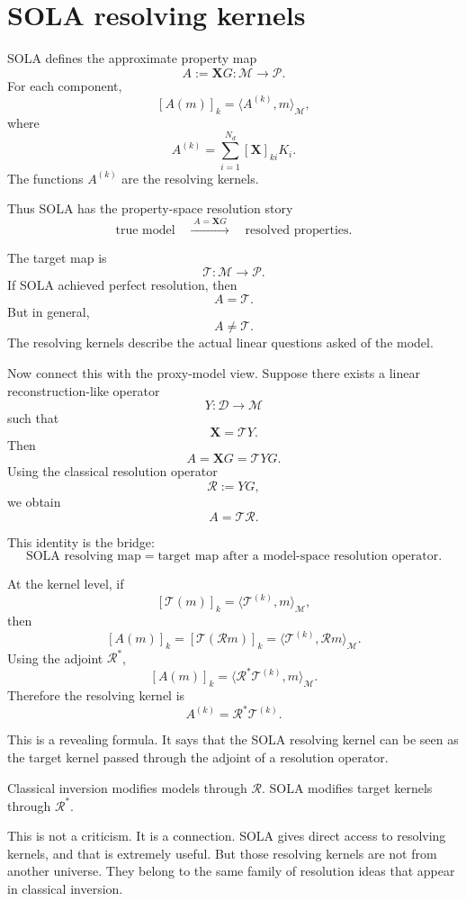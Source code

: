 \documentclass[11pt,openany]{book}
\theoremstyle{definition}
\theoremstyle{remark}
\newcommand{\M}{\mathcal M}
\newcommand{\D}{\mathcal D}
\newcommand{\Pspace}{\mathcal P}
\newcommand{\Tau}{\mathcal{T}}
\begin{document}
\section{SOLA resolving kernels}

SOLA defines the approximate property map
\[
  A:=\mathbf XG:\M\to\Pspace.
\]
For each component,
\[
  [A(m)]_k
  =
  \langle A^{(k)},m\rangle_{\M},
\]
where
\[
  A^{(k)}
  =
  \sum_{i=1}^{N_d}[\mathbf X]_{ki}K_i.
\]
The functions \(A^{(k)}\) are the resolving kernels.

Thus SOLA has the property-space resolution story
\[
  \text{true model}
  \quad
  \xrightarrow{\;A=\mathbf XG\;}
  \quad
  \text{resolved properties}.
\]

The target map is
\[
  \Tau:\M\to\Pspace.
\]
If SOLA achieved perfect resolution, then
\[
  A=\Tau.
\]
But in general,
\[
  A\neq\Tau.
\]
The resolving kernels describe the actual linear questions asked of the model.

Now connect this with the proxy-model view. Suppose there exists a linear reconstruction-like
operator
\[
  Y:\D\to\M
\]
such that
\[
  \mathbf X=\Tau Y.
\]
Then
\[
  A=\mathbf XG=\Tau YG.
\]
Using the classical resolution operator
\[
  \mathcal R:=YG,
\]
we obtain
\[
  A=\Tau\mathcal R.
\]

This identity is the bridge:
\[
  \boxed{
    \text{SOLA resolving map}
    =
    \text{target map after a model-space resolution operator}.
  }
\]

At the kernel level, if
\[
  [\Tau(m)]_k
  =
  \langle \mathcal T^{(k)},m\rangle_{\M},
\]
then
\[
  [A(m)]_k
  =
  [\Tau(\mathcal R m)]_k
  =
  \langle \mathcal T^{(k)},\mathcal R m\rangle_{\M}.
\]
Using the adjoint \(\mathcal R^*\),
\[
  [A(m)]_k
  =
  \langle \mathcal R^*\mathcal T^{(k)},m\rangle_{\M}.
\]
Therefore the resolving kernel is
\[
  A^{(k)}
  =
  \mathcal R^*\mathcal T^{(k)}.
\]

This is a revealing formula. It says that the SOLA resolving kernel can be seen as the target
kernel passed through the adjoint of a resolution operator.

\begin{checkpointbox}
Classical inversion modifies models through \(\mathcal R\). SOLA modifies target kernels through
\(\mathcal R^*\).
\end{checkpointbox}

This is not a criticism. It is a connection. SOLA gives direct access to resolving kernels, and that
is extremely useful. But those resolving kernels are not from another universe. They belong to
the same family of resolution ideas that appear in classical inversion.
\end{document}
